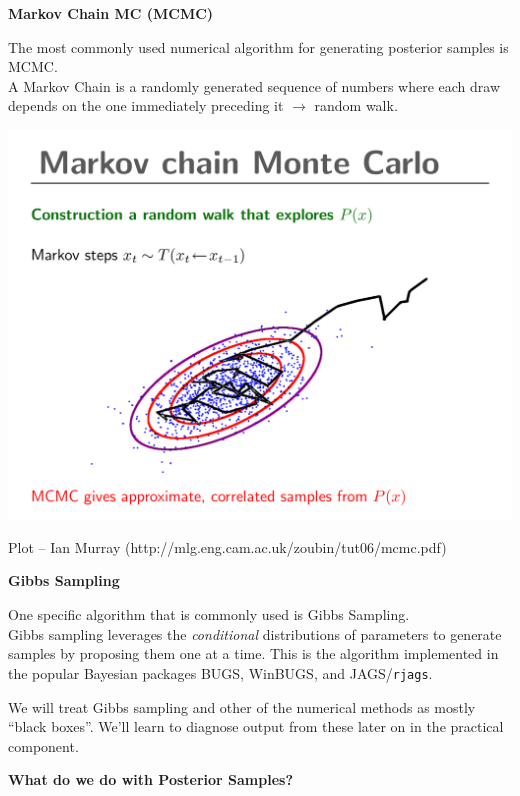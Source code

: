 \documentclass[12pt,xcolor=svgnames]{beamer}
\newcommand{\bl}{\color{blue}}
\newcommand{\theme}{\color{FireBrick}}
\newcommand{\sk}{\vspace{.4cm}}
\newcommand{\chap}[1]{{\theme \Large \bf #1} \sk}
\begin{document}
\begin{frame}
\chap{Markov Chain MC (MCMC)}

The most commonly used numerical algorithm for generating posterior samples is MCMC. \\

\sk
A {\bl Markov Chain} is a randomly generated sequence of numbers where each draw depends on the one immediately preceding it $\rightarrow$ random walk.


\begin{center}
\hspace{2.75cm} \includegraphics[scale=0.375,trim=30 80 0 70]{MCMC}
\end{center}

\vfill
\hfill {\tiny Plot -- Ian Murray (http://mlg.eng.cam.ac.uk/zoubin/tut06/mcmc.pdf)} 
\end{frame}

\begin{frame}
\chap{Gibbs Sampling}

One specific algorithm that is commonly used is {\bl Gibbs Sampling}. \\

\sk
Gibbs sampling leverages the {\em conditional} distributions of parameters to generate samples by proposing them one at a time. This is the algorithm implemented in the popular Bayesian packages {\sf BUGS}, {\sf WinBUGS}, and {\sf JAGS}/{\tt rjags}. 

\sk 
We will treat Gibbs sampling and other of the numerical methods as mostly ``black boxes''. We'll learn to diagnose output from these later on in the practical component.


\end{frame}


\begin{frame}
\chap{What do we do with Posterior Samples?}


\end{frame}
\end{document}
